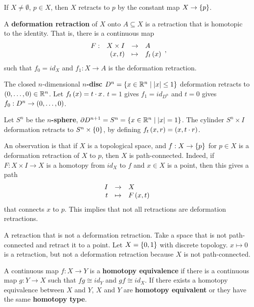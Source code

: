 \begin{example*}
If $ X \ne \emptyset $, $ p \in X $, then $ X $ retracts to $ p $ by the constant map $ X \to \left\{ p \right\} $.
\end{example*}

\begin{definition*}
A \textbf{deformation retraction} of $ X $ onto $ A \subseteq X $ is a retraction that is homotopic to the identity. That is, there is a continuous map
$$ \function[F]{X \times I}{A}{\rb{x, t}}{f_t\rb{x}}, $$
such that $ f_0 = id_X $ and $ f_1 : X \to A $ is the deformation retraction.
\end{definition*}

\begin{example*}
The closed $ n $-dimensional \textbf{$ n $-disc} $ D^n = \left\{ x \in \mathbb{R}^n \mid \left\lvert x \right\rvert \le 1 \right\} $ deformation retracts to $ \left( 0, \dots, 0 \right) \in \mathbb{R}^n $. Let $ f_t\left( x \right) = t \cdot x $. $ t = 1 $ gives $ f_1 = id_{D^n} $ and $ t = 0 $ gives $ f_0 : D^n \to \left( 0, \dots, 0 \right) $.
\end{example*}

\begin{example*}
Let $ S^n $ be the \textbf{$ n $-sphere}, $ \partial D^{n + 1} = S^n = \left\{ x \in \mathbb{R}^n \mid \left\lvert x \right\rvert = 1 \right\} $. The cylinder $ S^n \times I $ deformation retracts to $ S^n \times \left\{ 0 \right\} $, by defining $ f_t\left( x, r \right) = \left( x, t \cdot r \right) $.
\end{example*}

An observation is that if $ X $ is a topological space, and $ f : X \to \left\{ p \right\} $ for $ p \in X $ is a deformation retraction of $ X $ to $ p $, then $ X $ is path-connected. Indeed, if $ F : X \times I \to X $ is a homotopy from $ id_X $ to $ f $ and $ x \in X $ is a point, then this gives a path
$$ \function{I}{X}{t}{F\rb{x, t}} $$
that connects $ x $ to $ p $. This implies that not all retractions are deformation retractions.

\begin{example*}
A retraction that is not a deformation retraction. Take a space that is not path-connected and retract it to a point. Let $ X = \left\{ 0, 1 \right\} $ with discrete topology. $ x \mapsto 0 $ is a retraction, but not a deformation retraction because $ X $ is not path-connected.
\end{example*}

\begin{definition*}
A continuous map $ f : X \to Y $ is a \textbf{homotopy equivalence} if there is a continuous map $ g : Y \to X $ such that $ fg \cong id_Y $ and $ gf \cong id_X $. If there exists a homotopy equivalence between $ X $ and $ Y $, $ X $ and $ Y $ are \textbf{homotopy equivalent} or they have the same \textbf{homotopy type}.
\end{definition*}

